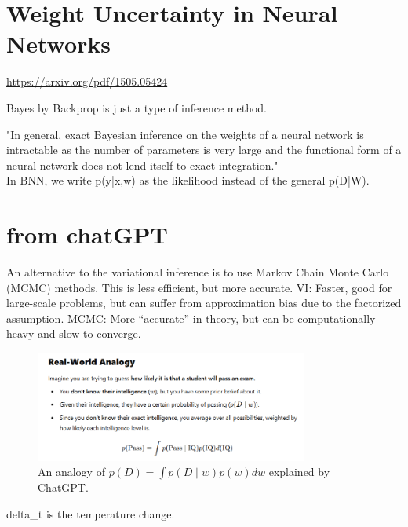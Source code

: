 \section{Weight Uncertainty in Neural Networks}
\url{https://arxiv.org/pdf/1505.05424}

Bayes by Backprop is just a type of inference method.

"In general, exact Bayesian inference on the weights of a neural network is intractable as the number of parameters is very large and the functional form of a neural network does not lend itself to exact integration."
\\
In BNN, we write p(y|x,w) as the likelihood instead of the general p(D|W). 


\section{from chatGPT}

An alternative to the variational inference is to use Markov Chain Monte Carlo (MCMC) methods. This is less efficient, but more accurate. 
VI: Faster, good for large-scale problems, but can suffer from approximation bias due to the factorized assumption.
MCMC: More “accurate” in theory, but can be computationally heavy and slow to converge.

\begin{figure}
  \centering
  \includegraphics[width=0.8\textwidth]{figures/analogy_chatGPT.png}
  \caption{An analogy of \( p(D)=\int p(D \mid w)p(w)dw \) explained by ChatGPT.}
  \label{fig:analogy_chatGPT_unique}
\end{figure}



\gls{delta_t} is the temperature change.

